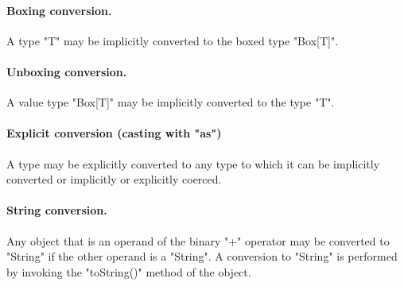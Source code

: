 
\paragraph{Boxing conversion.}
A type \xcd"T" may be implicitly converted to the
boxed type \xcd"Box[T]".


\paragraph{Unboxing conversion.}
A value type \xcd"Box[T]" may be implicitly converted to the
type \xcd"T".


\paragraph{Explicit conversion (casting with \xcd"as")}
A type may be explicitly converted to any type to which it can be
implicitly converted or implicitly or explicitly coerced.


\paragraph{String conversion.}
Any object that is an operand of the binary
\xcd"+" operator may
be converted to \xcd"String" if the other operand is a \xcd"String".
A conversion to \xcd"String" is performed by invoking the \xcd"toString()"
method of the object.



